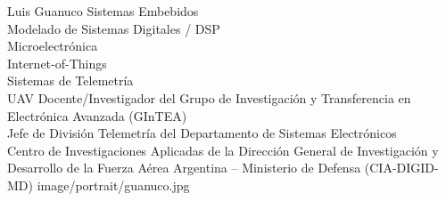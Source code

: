 \presentacion
  {Luis Guanuco}
  {Sistemas Embebidos\\Modelado de Sistemas Digitales / DSP\\Microelectrónica\\Internet-of-Things\\Sistemas de Telemetría\\UAV}
  {Docente/Investigador del Grupo de Investigación y Transferencia en Electrónica Avanzada (GInTEA)\\Jefe de División Telemetría del Departamento de Sistemas Electrónicos\\Centro de Investigaciones Aplicadas de la Dirección General de Investigación y Desarrollo de la Fuerza Aérea Argentina – Ministerio de Defensa (CIA-DIGID-MD)}
  {image/portrait/guanuco.jpg}

